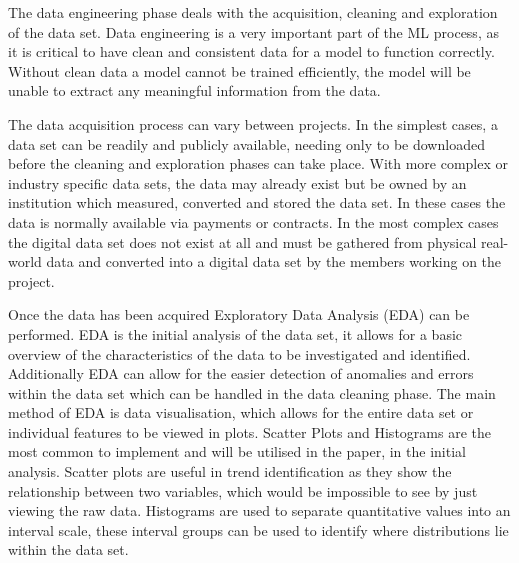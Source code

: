 \documentclass{imc-inf}
\begin{document}
	The data engineering phase deals with the acquisition, cleaning and exploration of the data set. Data engineering is a very important part of the ML process, as it is critical to have clean and consistent data for a model to function correctly. Without clean data a model cannot be trained efficiently, the model will be unable to extract any meaningful information from the data. 
	\newline
	
	The data acquisition process can vary between projects. In the simplest cases, a data set can be readily and publicly available, needing only to be downloaded before the cleaning and exploration phases can take place. With more complex or industry specific data sets, the data may already exist but be owned by an institution which measured, converted and stored the data set. In these cases the data is normally available via payments or contracts. In the most complex cases the digital data set does not exist at all and must be gathered from physical real-world data and converted into a digital data set by the members working on the project. 
	\newline
	
	Once the data has been acquired Exploratory Data Analysis (EDA) can be performed. EDA is the initial analysis of the data set, it allows for a basic overview of the characteristics of the data to be investigated and identified. Additionally EDA can allow for the easier detection of anomalies and errors within the data set which can be handled in the data cleaning phase. The main method of EDA is data visualisation, which allows for the entire data set or individual features to be viewed in plots. Scatter Plots and Histograms are the most common to implement and will be utilised in the paper, in the initial analysis. Scatter plots are useful in trend identification as they show the relationship between two variables, which would be impossible to see by just viewing the raw data. Histograms are used to separate quantitative values into an interval scale, these interval groups can be used to identify where distributions lie within the data set.
	\newline
	
\end{document}
